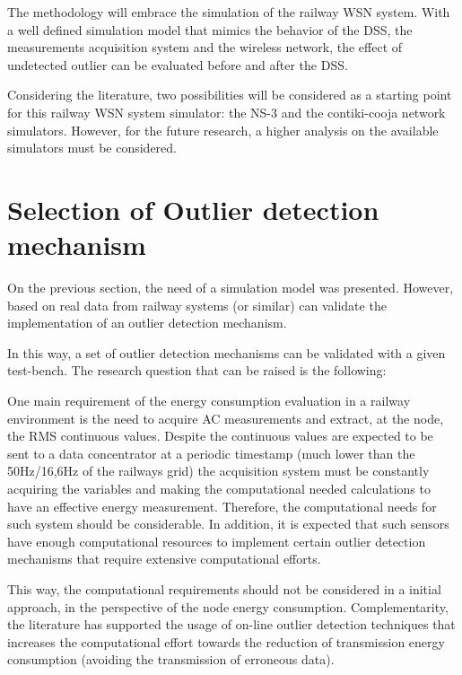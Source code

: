 The methodology will embrace the simulation of the railway WSN system. With a well defined simulation model that mimics the behavior of the DSS, the measurements acquisition system and the wireless network, the effect of undetected outlier can be evaluated before and after the DSS.

Considering the literature, two possibilities will be considered as a starting point for this railway WSN system simulator: the NS-3 and the contiki-cooja network simulators. However, for the future research, a higher analysis on the available simulators must be considered.


\section{Selection of Outlier detection mechanism}

On the previous section, the need of a simulation model was presented. However, based on real data from railway systems (or similar) can validate the implementation of an outlier detection mechanism.

In this way, a set of outlier detection mechanisms can be validated with a given test-bench. The research question that can be raised is the following:

\vspace{0.5em}
{}\par
\vspace{1.5em}

One main requirement of the energy consumption evaluation in a railway environment is the need to acquire AC measurements and extract, at the node, the RMS continuous values. Despite the continuous values are expected to be sent to a data concentrator at a periodic timestamp (much lower than the 50Hz/16,6Hz of the railways grid) the acquisition system must be constantly acquiring the variables and making the computational needed calculations to have an effective energy measurement. Therefore, the computational needs for such system should be considerable. In addition, it is expected that such sensors have enough computational resources to implement certain outlier detection mechanisms that require extensive computational efforts.

This way, the computational requirements should not be considered in a initial approach, in the perspective of the node energy consumption. Complementarity, the literature has supported the usage of on-line outlier detection techniques that increases the computational effort towards the reduction of transmission energy consumption (avoiding the transmission of erroneous data).

